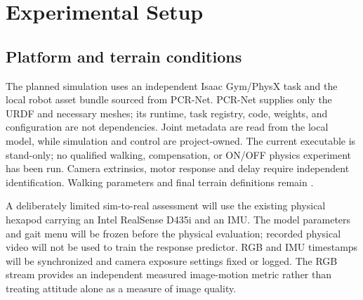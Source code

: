 \section{Experimental Setup}\label{sec:experiments}
\subsection{Platform and terrain conditions}
The planned simulation uses an independent Isaac Gym/PhysX task and the local robot asset bundle sourced from PCR-Net. PCR-Net supplies only the URDF and necessary meshes; its runtime, task registry, code, weights, and configuration are not dependencies. Joint metadata are read from the local model, while simulation and control are project-owned. The current executable is stand-only; no qualified walking, compensation, or ON/OFF physics experiment has been run. Camera extrinsics, motor response and delay require independent identification. Walking parameters and final terrain definitions remain .

A deliberately limited sim-to-real assessment will use the existing physical hexapod carrying an Intel RealSense D435i and an IMU. The model parameters and gait menu will be frozen before the physical evaluation; recorded physical video will not be used to train the response predictor. RGB and IMU timestamps will be synchronized and camera exposure settings fixed or logged. The RGB stream provides an independent measured image-motion metric rather than treating attitude alone as a measure of image quality.

